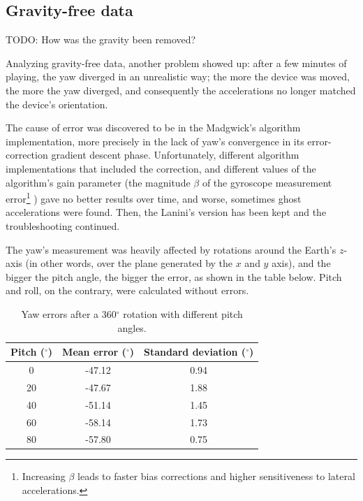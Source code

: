 \subsection{Gravity-free data}
TODO: How was the gravity been removed?

Analyzing gravity-free data, another problem showed up: after a few minutes of playing, the yaw diverged in an unrealistic way; the more the device was moved, the more the yaw diverged, and consequently the accelerations no longer matched the device's orientation.

The cause of error was discovered to be in the Madgwick's algorithm implementation, more precisely in the lack of yaw's convergence in its error-correction gradient descent phase. Unfortunately, different algorithm implementations that included the correction, and different values of the algorithm's gain parameter (the magnitude $\beta$ of the gyroscope measurement error\footnote{Increasing $\beta$ leads to faster bias corrections and higher sensitiveness to lateral accelerations.} \cite[13]{Mad10}) gave no better results over time, and worse, sometimes ghost accelerations were found. Then, the Lanini's version has been kept and the troubleshooting continued.
\bigbreak

The yaw's measurement was heavily affected by rotations around the Earth's $z$-axis (in other words, over the plane generated by the $x$ and $y$ axis), and the bigger the pitch angle, the bigger the error, as shown in the table below. Pitch and roll, on the contrary, were calculated without errors.
\bigbreak

\begin{table}[ht!]
	\centering
	\begin{tabular}{c|c c}
	\textbf{Pitch} ($^{\circ}$) & \textbf{Mean error} ($^{\circ}$) & \textbf{Standard deviation} ($^{\circ}$) \\ \hline
	0                           & -47.12                           & 0.94                                     \\
	20                          & -47.67                           & 1.88                                     \\
	40                          & -51.14                           & 1.45                                     \\
	60                          & -58.14                           & 1.73                                     \\
	80                          & -57.80                           & 0.75
	\end{tabular}
	\caption{Yaw errors after a 360$^{\circ}$ rotation with different pitch angles.}
\end{table}

